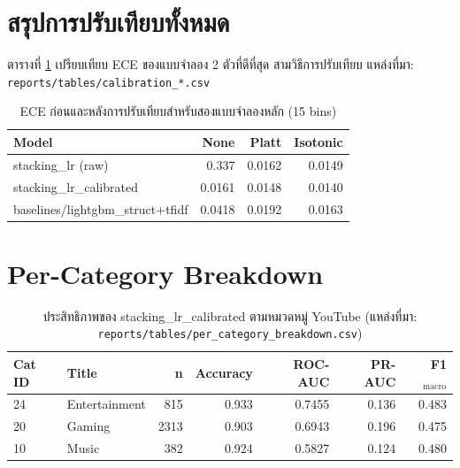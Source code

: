 \section{สรุปการปรับเทียบทั้งหมด}
\label{app:calibration-full}

ตารางที่ \ref{tab:calib-full} เปรียบเทียบ ECE ของแบบจำลอง 2 ตัวที่ดีที่สุด
สามวิธีการปรับเทียบ แหล่งที่มา: \texttt{reports/tables/calibration\_*.csv}

\begin{table}[H]
\centering
\caption{ECE ก่อนและหลังการปรับเทียบสำหรับสองแบบจำลองหลัก (15 bins)}
\label{tab:calib-full}
\begin{tabularx}{\textwidth}{X|rrr}
\toprule
\textbf{Model} & \textbf{None} & \textbf{Platt} & \textbf{Isotonic} \\
\midrule
stacking\_lr (raw)               & 0.337 & 0.0162 & 0.0149 \\
stacking\_lr\_calibrated         & 0.0161 & 0.0148 & 0.0140 \\
baselines/lightgbm\_struct+tfidf & 0.0418 & 0.0192 & 0.0163 \\
\bottomrule
\end{tabularx}
\end{table}

\section{Per-Category Breakdown}
\label{app:category-full}

\begin{table}[H]
\centering
\caption{ประสิทธิภาพของ stacking\_lr\_calibrated ตามหมวดหมู่ YouTube
(แหล่งที่มา: \texttt{reports/tables/per\_category\_breakdown.csv})}
\label{tab:cat-full}
\begin{tabularx}{\textwidth}{lXrrrrr}
\toprule
\textbf{Cat ID} & \textbf{Title} & \textbf{n} & \textbf{Accuracy} & \textbf{ROC-AUC} & \textbf{PR-AUC} & \textbf{F1$_{\text{macro}}$} \\
\midrule
24 & Entertainment & 815  & 0.933 & 0.7455 & 0.136 & 0.483 \\
20 & Gaming        & 2313 & 0.903 & 0.6943 & 0.196 & 0.475 \\
10 & Music         & 382  & 0.924 & 0.5827 & 0.124 & 0.480 \\
\bottomrule
\end{tabularx}
\end{table}
